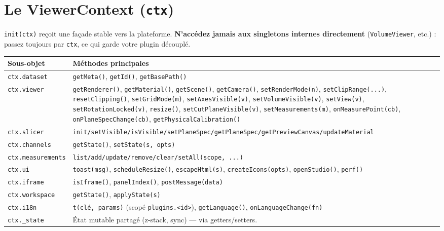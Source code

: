 \documentclass[11pt,a4paper]{article}
\newcommand{\code}[1]{\texttt{#1}}
\begin{document}
\section{Le ViewerContext (\code{ctx})}

\code{init(ctx)} reçoit une façade stable vers la plateforme. \textbf{N'accédez
jamais aux singletons internes directement} (\code{VolumeViewer}, etc.) : passez
toujours par \code{ctx}, ce qui garde votre plugin découplé.

\begin{center}
\begin{tabularx}{\linewidth}{@{}l X@{}}
\toprule
\textbf{Sous-objet} & \textbf{Méthodes principales} \\
\midrule
\code{ctx.dataset}  & \code{getMeta()}, \code{getId()}, \code{getBasePath()} \\
\code{ctx.viewer}   & \code{getRenderer()}, \code{getMaterial()}, \code{getScene()}, \code{getCamera()},
                      \code{setRenderMode(n)}, \code{setClipRange(...)}, \code{resetClipping()},
                      \code{setGridMode(m)}, \code{setAxesVisible(v)}, \code{setVolumeVisible(v)},
                      \code{setView(v)}, \code{setRotationLocked(v)}, \code{resize()},
                      \code{setCutPlaneVisible(v)}, \code{setMeasurements(m)},
                      \code{onMeasurePoint(cb)}, \code{onPlaneSpecChange(cb)},
                      \code{getPhysicalCalibration()} \\
\code{ctx.slicer}   & \code{init/setVisible/isVisible/setPlaneSpec/getPlaneSpec/getPreviewCanvas/updateMaterial} \\
\code{ctx.channels} & \code{getState()}, \code{setState(s, opts)} \\
\code{ctx.measurements} & \code{list/add/update/remove/clear/setAll(scope, ...)} \\
\code{ctx.ui}       & \code{toast(msg)}, \code{scheduleResize()}, \code{escapeHtml(s)},
                      \code{createIcons(opts)}, \code{openStudio()}, \code{perf()} \\
\code{ctx.iframe}   & \code{isIframe()}, \code{panelIndex()}, \code{postMessage(data)} \\
\code{ctx.workspace}& \code{getState()}, \code{applyState(s)} \\
\code{ctx.i18n}     & \code{t(clé, params)} (scopé \code{plugins.<id>}), \code{getLanguage()}, \code{onLanguageChange(fn)} \\
\code{ctx.\_state}  & État mutable partagé (z-stack, sync) --- via getters/setters. \\
\bottomrule
\end{tabularx}
\end{center}
\end{document}
